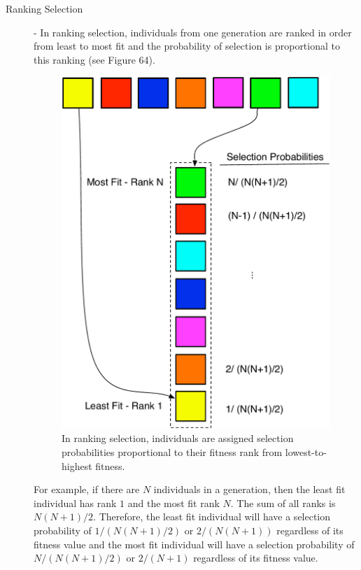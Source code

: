 \documentclass[12pt]{report} 	%
\numberwithin{figure}{chapter}
\numberwithin{table}{chapter}
\numberwithin{equation}{chapter}
\begin{document}
\begin{flushleft}
\begin{description}
\item [Ranking Selection] - In ranking selection, individuals from one generation are ranked in order from least to most fit and the probability of selection is proportional to this ranking (see Figure 64). 
\begin{figure}[h!]
\begin{center}
\includegraphics[scale = 0.6]{RankSelection}
\caption[Ranking selection]{In ranking selection, individuals are assigned selection probabilities proportional to their fitness rank from lowest-to-highest fitness.}
\end{center}
\vspace{6pt}
\end{figure}
For example, if there are $N$ individuals in a generation, then the least fit individual has rank $1$ and the most fit rank $N$. The sum of all ranks is $N(N+1)/2$. Therefore, the least fit individual will have a selection probability of $1/(N(N+1)/2)$ or $2/(N(N+1))$ regardless of its fitness value and the most fit individual will have a selection probability of $N/(N(N+1)/2)$ or $2/(N+1)$ regardless of its fitness value. 


\end{description}
\end{flushleft}
\end{document}
